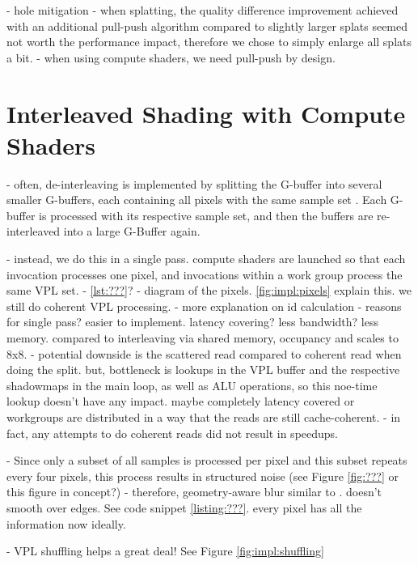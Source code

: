 

- hole mitigation
- when splatting, the quality difference improvement achieved with an additional pull-push algorithm compared to slightly larger splats seemed not worth the performance impact, therefore we chose to simply enlarge all splats a bit.
- when using compute shaders, we need pull-push by design.


\section{Interleaved Shading with Compute Shaders}
\label{sec:impl:interleavedShading}
- often, de-interleaving is implemented by splitting the G-buffer into several smaller G-buffers, each containing all pixels with the same sample set \cite{segovia2006non}. Each G-buffer is processed with its respective sample set, and then the buffers are re-interleaved into a large G-Buffer again.

- instead, we do this in a single pass. compute shaders are launched so that each invocation processes one pixel, and invocations within a work group process the same VPL set.
- \ref{lst:???}?
- diagram of the pixels. \ref{fig:impl:pixels} explain this. we still do coherent VPL processing.
- more explanation on id calculation
- reasons for single pass? easier to implement. latency covering? less bandwidth? less memory. compared to interleaving via shared memory, occupancy and scales to 8x8.
- potential downside is the scattered read compared to coherent read when doing the split. but, bottleneck is lookups in the VPL buffer and the respective shadowmaps in the main loop, as well as ALU operations, so this noe-time lookup doesn't have any impact. maybe completely latency covered or workgroups are distributed in a way that the reads are still cache-coherent.
- in fact, any attempts to do coherent reads did not result in speedups.

- Since only a subset of all samples is processed per pixel and this subset repeats every four pixels, this process results in structured noise (see Figure \ref{fig:???} or this figure in concept?)
- therefore, geometry-aware blur similar to \citet{laine2007incremental}. doesn't smooth over edges. See code snippet \ref{listing:???}. every pixel has all the information now ideally.

- VPL shuffling helps a great deal! See Figure \ref{fig:impl:shuffling}


